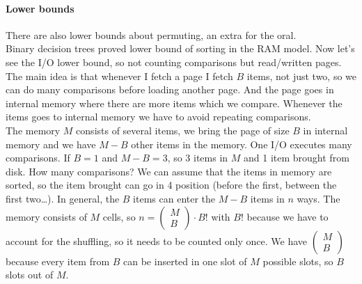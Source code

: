 \documentclass[10pt]{report}
\begin{document}
\paragraph{Lower bounds} There are also lower bounds about permuting, an extra for the oral.\\
Binary decision trees proved lower bound of sorting in the RAM model. Now let's see the I/O lower bound, so not counting comparisons but read/written pages. The main idea is that whenever I fetch a page I fetch $B$ items, not just two, so we can do many comparisons before loading another page. And the page goes in internal memory where there are more items which we compare. Whenever the items goes to internal memory we have to avoid repeating comparisons.\\
The memory $M$ consists of several items, we bring the page of size $B$ in internal memory and we have $M-B$ other items in the memory. One I/O executes many comparisons. If $B = 1$ and $M - B = 3$, so 3 items in $M$ and 1 item brought from disk. How many comparisons? We can assume that the items in memory are sorted, so the item brought can go in 4 position (before the first, between the first two\ldots). In general, the $B$ items can enter the $M-B$ items in $n$ ways. The memory consists of $M$ cells, so $n = \left(\begin{array}{c}
M\\B
\end{array}\right)\cdot B!$ with $B!$ because we have to account for the shuffling, so it needs to be counted only once. We have $\left(\begin{array}{c}
M\\B
\end{array}\right)$ because every item from $B$ can be inserted in one slot of $M$ possible slots, so $B$ slots out of $M$.\\
\end{document}
